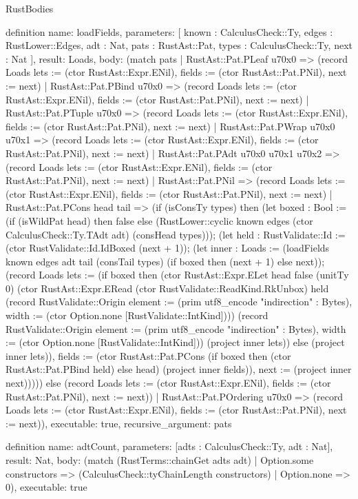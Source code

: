 \begin{lexlean}{RustBodies}
\begin{semanticmodule}
definition{
  name: loadFields,
  parameters: [
    known : CalculusCheck::Ty,
    edges : RustLower::Edges,
    adt : Nat,
    pats : RustAst::Pat,
    types : CalculusCheck::Ty,
    next : Nat
  ],
  result: Loads,
  body: (match pats
    | RustAst::Pat.PLeaf u70x0 => (record Loads {lets := (ctor RustAst::Expr.ENil), fields := (ctor RustAst::Pat.PNil), next := next})
    | RustAst::Pat.PBind u70x0 => (record Loads {lets := (ctor RustAst::Expr.ENil), fields := (ctor RustAst::Pat.PNil), next := next})
    | RustAst::Pat.PTuple u70x0 => (record Loads {lets := (ctor RustAst::Expr.ENil), fields := (ctor RustAst::Pat.PNil), next := next})
    | RustAst::Pat.PWrap u70x0 u70x1 => (record Loads {lets := (ctor RustAst::Expr.ENil), fields := (ctor RustAst::Pat.PNil), next := next})
    | RustAst::Pat.PAdt u70x0 u70x1 u70x2 => (record Loads {lets := (ctor RustAst::Expr.ENil), fields := (ctor RustAst::Pat.PNil), next := next})
    | RustAst::Pat.PNil => (record Loads {lets := (ctor RustAst::Expr.ENil), fields := (ctor RustAst::Pat.PNil), next := next})
    | RustAst::Pat.PCons head tail => (if (isConsTy types) then (let boxed : Bool := (if (isWildPat head) then false else (RustLower::cyclic known edges (ctor CalculusCheck::Ty.TAdt adt) (consHead types))); (let held : RustValidate::Id := (ctor RustValidate::Id.IdBoxed (next + 1)); (let inner : Loads := (loadFields known edges adt tail (consTail types) (if boxed then (next + 1) else next)); (record Loads {lets := (if boxed then (ctor RustAst::Expr.ELet head false (unitTy 0) (ctor RustAst::Expr.ERead (ctor RustValidate::ReadKind.RkUnbox) held (record RustValidate::Origin {element := (prim utf8_encode "indirection" : Bytes), width := (ctor Option.none [RustValidate::IntKind])})) (record RustValidate::Origin {element := (prim utf8_encode "indirection" : Bytes), width := (ctor Option.none [RustValidate::IntKind])}) (project inner lets)) else (project inner lets)), fields := (ctor RustAst::Pat.PCons (if boxed then (ctor RustAst::Pat.PBind held) else head) (project inner fields)), next := (project inner next)})))) else (record Loads {lets := (ctor RustAst::Expr.ENil), fields := (ctor RustAst::Pat.PNil), next := next}))
    | RustAst::Pat.POrdering u70x0 => (record Loads {lets := (ctor RustAst::Expr.ENil), fields := (ctor RustAst::Pat.PNil), next := next})),
  executable: true,
  recursive_argument: pats
}

definition{
  name: adtCount,
  parameters: [adts : CalculusCheck::Ty, adt : Nat],
  result: Nat,
  body: (match (RustTerms::chainGet adts adt)
    | Option.some constructors => (CalculusCheck::tyChainLength constructors)
    | Option.none => 0),
  executable: true
}


\end{semanticmodule}
\end{lexlean}
